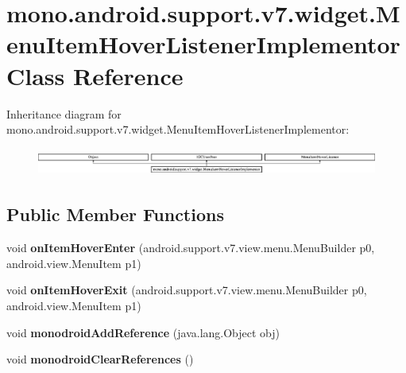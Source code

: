 \hypertarget{classmono_1_1android_1_1support_1_1v7_1_1widget_1_1_menu_item_hover_listener_implementor}{}\section{mono.\+android.\+support.\+v7.\+widget.\+Menu\+Item\+Hover\+Listener\+Implementor Class Reference}
\label{classmono_1_1android_1_1support_1_1v7_1_1widget_1_1_menu_item_hover_listener_implementor}
Inheritance diagram for mono.\+android.\+support.\+v7.\+widget.\+Menu\+Item\+Hover\+Listener\+Implementor\+:\begin{figure}[H]
\begin{center}
\leavevmode
\includegraphics[height=0.919540cm]{classmono_1_1android_1_1support_1_1v7_1_1widget_1_1_menu_item_hover_listener_implementor}
\end{center}
\end{figure}
\subsection*{Public Member Functions}
\begin{DoxyCompactItemize}
\item 
\mbox{\label{classmono_1_1android_1_1support_1_1v7_1_1widget_1_1_menu_item_hover_listener_implementor_afad93d8a57fc2c8063d02756cc5e05f3}} 
void {\bfseries on\+Item\+Hover\+Enter} (android.\+support.\+v7.\+view.\+menu.\+Menu\+Builder p0, android.\+view.\+Menu\+Item p1)
\item 
\mbox{\label{classmono_1_1android_1_1support_1_1v7_1_1widget_1_1_menu_item_hover_listener_implementor_a76b4f45a652d7bded4b5303f6163098c}} 
void {\bfseries on\+Item\+Hover\+Exit} (android.\+support.\+v7.\+view.\+menu.\+Menu\+Builder p0, android.\+view.\+Menu\+Item p1)
\item 
\mbox{\label{classmono_1_1android_1_1support_1_1v7_1_1widget_1_1_menu_item_hover_listener_implementor_abd21a3c57e8c6923ad5e761a20cd4912}} 
void {\bfseries monodroid\+Add\+Reference} (java.\+lang.\+Object obj)
\item 
\mbox{\label{classmono_1_1android_1_1support_1_1v7_1_1widget_1_1_menu_item_hover_listener_implementor_a548908820e48dd5c76dfbf565d702c4c}} 
void {\bfseries monodroid\+Clear\+References} ()
\end{DoxyCompactItemize}
